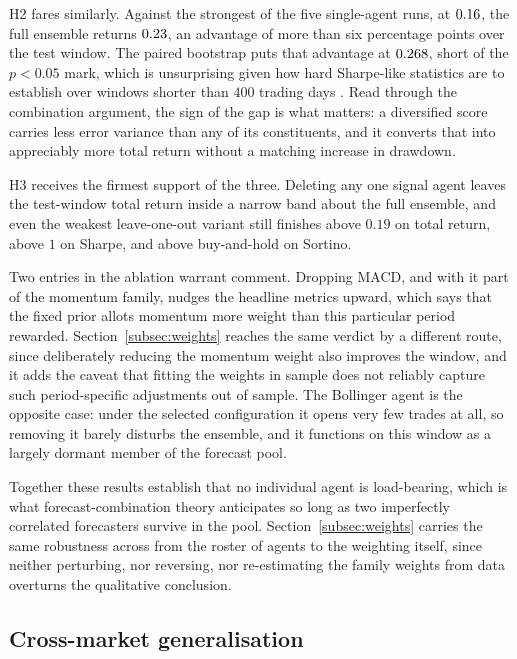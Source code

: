 H2 fares similarly. Against the strongest of the five single-agent runs, \BestSingleName{} at $0.16$, the full ensemble returns $0.23$, an advantage of more than six percentage points over the test window. The paired bootstrap puts that advantage at $0.268$, short of the $p < 0.05$ mark, which is unsurprising given how hard Sharpe-like statistics are to establish over windows shorter than $400$ trading days \cite{bailey2014}. Read through the combination argument, the sign of the gap is what matters: a diversified score carries less error variance than any of its constituents, and it converts that into appreciably more total return without a matching increase in drawdown.

H3 receives the firmest support of the three. Deleting any one signal agent leaves the test-window total return inside a narrow band about the full ensemble, and even the weakest leave-one-out variant still finishes above $0.19$ on total return, above $1$ on Sharpe, and above buy-and-hold on Sortino.

Two entries in the ablation warrant comment. Dropping MACD, and with it part of the momentum family, nudges the headline metrics upward, which says that the fixed prior allots momentum more weight than this particular period rewarded. Section~\ref{subsec:weights} reaches the same verdict by a different route, since deliberately reducing the momentum weight also improves the window, and it adds the caveat that fitting the weights in sample does not reliably capture such period-specific adjustments out of sample. The Bollinger agent is the opposite case: under the selected configuration it opens very few trades at all, so removing it barely disturbs the ensemble, and it functions on this window as a largely dormant member of the forecast pool.

Together these results establish that no individual agent is load-bearing, which is what forecast-combination theory anticipates so long as two imperfectly correlated forecasters survive in the pool. Section~\ref{subsec:weights} carries the same robustness across from the roster of agents to the weighting itself, since neither perturbing, nor reversing, nor re-estimating the family weights from data overturns the qualitative conclusion.

\subsection{Cross-market generalisation}\label{subsec:crossmarket}

